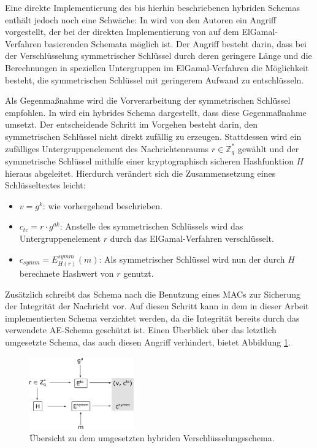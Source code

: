 Eine direkte Implementierung des bis hierhin beschriebenen hybriden Schemas enthält jedoch noch eine Schwäche: In \cite{boneh2000} wird von den Autoren ein Angriff vorgestellt, der bei der direkten Implementierung von auf dem ElGamal-Verfahren basierenden Schemata möglich ist. Der Angriff besteht darin, dass bei der Verschlüsselung symmetrischer Schlüssel durch deren geringere Länge und die Berechnungen in speziellen Untergruppen im ElGamal-Verfahren die Möglichkeit besteht, die symmetrischen Schlüssel mit geringerem Aufwand zu entschlüsseln.

Als Gegenmaßnahme wird die Vorverarbeitung der symmetrischen Schlüssel empfohlen. In \cite{abdalla1999} wird ein hybrides Schema dargestellt, dass diese Gegenmaßnahme umsetzt. Der entscheidende Schritt im Vorgehen besteht darin, den symmetrischen Schlüssel nicht direkt zufällig zu erzeugen. Stattdessen wird ein zufälliges Untergruppenelement des Nachrichtenraums \(r \in \mathbb{Z}_q^*\) gewählt und der symmetrische Schlüssel mithilfe einer kryptographisch sicheren Hashfunktion \(H\) hieraus abgeleitet. Hierdurch verändert sich die Zusammensetzung eines Schlüsseltextes leicht:

\begin{itemize}
  \item \(v = g^k\): wie vorhergehend beschrieben.
  \item \(c_{tc} = r \cdot g^{ak}\): Anstelle des symmetrischen Schlüssels wird das Untergruppenelement \(r\) durch das ElGamal-Verfahren verschlüsselt.
  \item \(c_{symm} = E^{symm}_{H(r)}(m)\): Als symmetrischer Schlüssel wird nun der durch \(H\) berechnete Hash\-wert von \(r\) genutzt.
\end{itemize}

Zusätzlich schreibt das Schema nach \cite{abdalla1999} die Benutzung eines MACs zur Sicherung der Integrität der Nachricht vor. Auf diesen Schritt kann in dem in dieser Arbeit implementierten Schema verzichtet werden, da die Integrität bereits durch das verwendete AE-Schema geschützt ist. Einen Überblick über das letztlich umgesetzte Schema, das auch diesen Angriff verhindert, bietet Abbildung \ref{fig:hybrid_scheme}.

\begin{figure}[]
    \centering
        \includegraphics[width=0.4\textwidth]{dia/hybrid_scheme.pdf}
    \caption{Übersicht zu dem umgesetzten hybriden Verschlüsselungsschema.}
    \label{fig:hybrid_scheme}
\end{figure}

